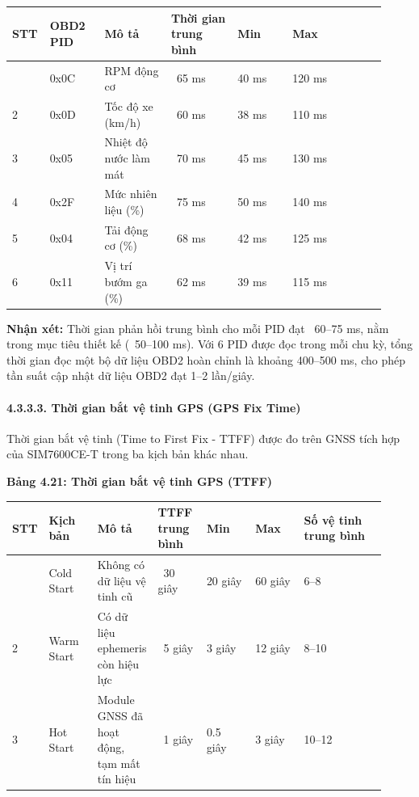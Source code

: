 \documentclass[13pt,a4paper]{extarticle}
\newcounter{none} %
\newcommand{\thesislongtableorignewline}{}
\let\thesislongtableorignewline\\
\renewcommand{\\}{\thesislongtableorignewline\hline}%
\let\\\thesislongtableorignewline
\newcommand{\thesistabletitle}[1]{%
  \begin{center}\textbf{#1}\end{center}%
}
\begin{document}
{\def\LTcaptype{none} %
\begin{longtable}{|p{0.06\linewidth}|p{0.14\linewidth}|p{0.17\linewidth}|p{0.17\linewidth}|p{0.14\linewidth}|p{0.24\linewidth}|}
\hline \textbf{STT} & \textbf{OBD2 PID} & \textbf{Mô tả} & \textbf{Thời gian trung bình} & \textbf{Min} & \textbf{Max} \\
\hline
\endhead
\hline
\endlastfoot
1 & 0x0C & RPM động cơ & ~65 ms & 40 ms & 120 ms \\
2 & 0x0D & Tốc độ xe (km/h) & ~60 ms & 38 ms & 110 ms \\
3 & 0x05 & Nhiệt độ nước làm mát & ~70 ms & 45 ms & 130
ms \\
4 & 0x2F & Mức nhiên liệu (\%) & ~75 ms & 50 ms & 140
ms \\
5 & 0x04 & Tải động cơ (\%) & ~68 ms & 42 ms & 125 ms \\
6 & 0x11 & Vị trí bướm ga (\%) & ~62 ms & 39 ms & 115
ms \\
\end{longtable}
}

\textbf{Nhận xét:} Thời gian phản hồi trung bình cho mỗi PID đạt
~60--75 ms, nằm trong mục tiêu thiết kế
(~50--100 ms). Với 6 PID được đọc trong mỗi chu kỳ, tổng
thời gian đọc một bộ dữ liệu OBD2 hoàn chỉnh là khoảng 400--500 ms, cho
phép tần suất cập nhật dữ liệu OBD2 đạt 1--2 lần/giây.

\paragraph{4.3.3.3. Thời gian bắt vệ tinh GPS (GPS Fix
Time)}\label{4333-thux1eddi-gian-bux1eaft-vux1ec7-tinh-gps-gps-fix-time}

Thời gian bắt vệ tinh (Time to First Fix - TTFF) được đo trên GNSS tích
hợp của SIM7600CE-T trong ba kịch bản khác nhau.

\thesistabletitle{Bảng 4.21: Thời gian bắt vệ tinh GPS (TTFF)}

{\def\LTcaptype{none} %
\begin{longtable}{|p{0.05\linewidth}|p{0.13\linewidth}|p{0.13\linewidth}|p{0.13\linewidth}|p{0.13\linewidth}|p{0.13\linewidth}|p{0.22\linewidth}|}
\hline \textbf{STT} & \textbf{Kịch bản} & \textbf{Mô tả} & \textbf{TTFF trung bình} & \textbf{Min} & \textbf{Max} & \textbf{Số vệ tinh trung
bình} \\
\hline
\endhead
\hline
\endlastfoot
1 & Cold Start & Không có dữ liệu vệ tinh cũ & ~30 giây &
20 giây & 60 giây & 6--8 \\
2 & Warm Start & Có dữ liệu ephemeris còn hiệu lực & ~5
giây & 3 giây & 12 giây & 8--10 \\
3 & Hot Start & Module GNSS đã hoạt động, tạm mất tín hiệu &
~1 giây & 0.5 giây & 3 giây & 10--12 \\
\end{longtable}
}
\end{document}
